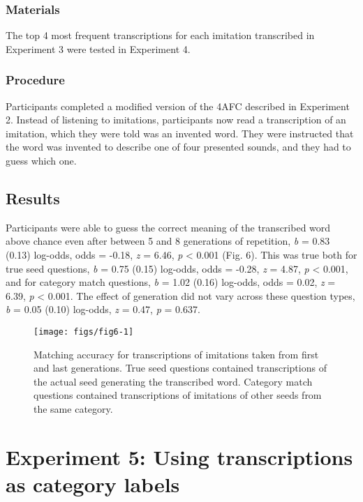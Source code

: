 \documentclass[10pt,letterpaper]{article}
\begin{document}
\subsubsection{Materials}\label{materials-3}

The top 4 most frequent transcriptions for each imitation transcribed in
Experiment 3 were tested in Experiment 4.

\subsubsection{Procedure}\label{procedure-3}

Participants completed a modified version of the 4AFC described in
Experiment 2. Instead of listening to imitations, participants now read
a transcription of an imitation, which they were told was an invented
word. They were instructed that the word was invented to describe one of
four presented sounds, and they had to guess which one.

\subsection{Results}\label{results-3}

Participants were able to guess the correct meaning of the transcribed
word above chance even after between 5 and 8 generations of repetition,
\emph{b} = 0.83 (0.13) log-odds, odds = -0.18, \emph{z} = 6.46, \emph{p}
\textless{} 0.001 (Fig. 6). This was true both for true seed questions,
\emph{b} = 0.75 (0.15) log-odds, odds = -0.28, \emph{z} = 4.87, \emph{p}
\textless{} 0.001, and for category match questions, \emph{b} = 1.02
(0.16) log-odds, odds = 0.02, \emph{z} = 6.39, \emph{p} \textless{}
0.001. The effect of generation did not vary across these question
types, \emph{b} = 0.05 (0.10) log-odds, \emph{z} = 0.47, \emph{p} =
0.637.

\begin{figure}
\texttt{[image: figs/fig6-1]} \caption{Matching accuracy for transcriptions of imitations taken from first and last generations. True seed questions contained transcriptions of the actual seed generating the transcribed word. Category match questions contained transcriptions of imitations of other seeds from the same category.}\label{fig:fig6}
\end{figure}

\section{Experiment 5: Using transcriptions as category
labels}\label{experiment-5-using-transcriptions-as-category-labels}
\end{document}
